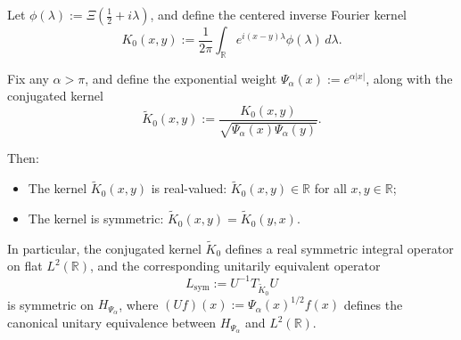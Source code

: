 \begin{lemma}
\label{lem:kernel_symmetry}
Let \( \phi(\lambda) := \Xi\left( \tfrac{1}{2} + i\lambda \right) \), and define the centered inverse Fourier kernel
\[
K_0(x,y) := \frac{1}{2\pi} \int_{\mathbb{R}} e^{i(x - y)\lambda} \phi(\lambda)\, d\lambda.
\]

Fix any \( \alpha > \pi \), and define the exponential weight \( \Psi_\alpha(x) := e^{\alpha |x|} \), along with the conjugated kernel
\[
\widetilde{K}_0(x,y) := \frac{K_0(x,y)}{\sqrt{\Psi_\alpha(x)\Psi_\alpha(y)}}.
\]

Then:
\begin{itemize}
    \item The kernel \( \widetilde{K}_0(x,y) \) is real-valued: \( \widetilde{K}_0(x,y) \in \mathbb{R} \) for all \( x, y \in \mathbb{R} \);
    \item The kernel is symmetric: \( \widetilde{K}_0(x,y) = \widetilde{K}_0(y,x) \).
\end{itemize}

\medskip
\noindent
In particular, the conjugated kernel \( \widetilde{K}_0 \) defines a real symmetric integral operator on flat \( L^2(\mathbb{R}) \), and the corresponding unitarily equivalent operator
\[
L_{\mathrm{sym}} := U^{-1} T_{\widetilde{K}_0} U
\]
is symmetric on \( H_{\Psi_\alpha} \), where \( (U f)(x) := \Psi_\alpha(x)^{1/2} f(x) \) defines the canonical unitary equivalence between \( H_{\Psi_\alpha} \) and \( L^2(\mathbb{R}) \).
\end{lemma}
